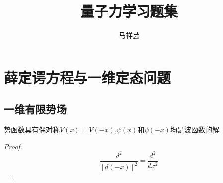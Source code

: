 

\title{量子力学习题集}
\author{马祥芸}


    \maketitle
    \tableofcontents
    \newpage

    \section{薛定谔方程与一维定态问题}
        \subsection{一维有限势场}
        \begin{thm}\label{thm:1.1}                                                %
            势函数具有偶对称$V(x)=V(-x)$,$\psi(x)$和$\psi(-x)$均是波函数的解
            
            \begin{proof}
                
                $$ \frac{d^2}{[d(-x)]^2}=\frac{d^2}{dx^2} $$ 

            \end{proof}
        
        \end{thm}
    

